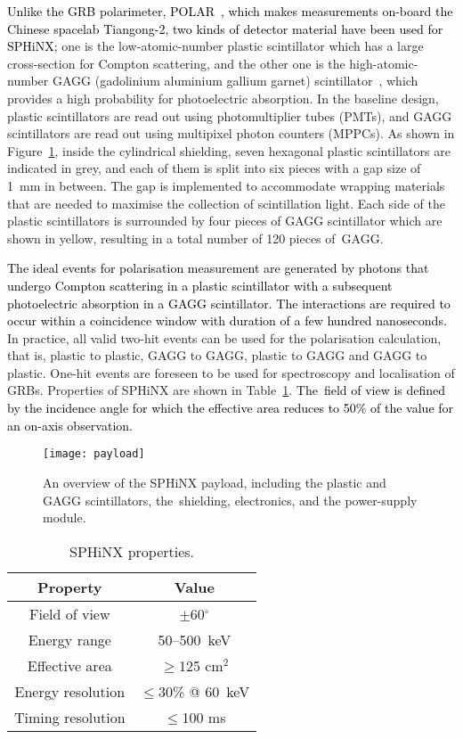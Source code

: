 \documentclass[galaxies,article,accept,moreauthors,pdftex,10pt,a4paper]{mdpi}
\begin{document}
\textcolor{black}{Unlike the GRB polarimeter, POLAR~\cite{ref:polar}, which makes measurements on-board the Chinese spacelab Tiangong-2, two kinds of detector material have been used for SPHiNX;} one is the low-atomic-number plastic scintillator which has a large cross-section for Compton scattering, and the other one is the high-atomic-number GAGG (gadolinium aluminium gallium garnet) scintillator\textcolor{black}{~\cite{ref:gagg}}, which provides a high probability for photoelectric absorption. In the baseline design, plastic scintillators are read out using photomultiplier tubes (PMTs), and GAGG scintillators are read out using multipixel photon counters (MPPCs).  As shown in Figure~\ref{fig:payload}, inside the cylindrical shielding, seven hexagonal plastic scintillators are indicated in grey, and each of them is split into six pieces with a gap size of 1~mm in between. The gap is implemented to accommodate wrapping materials that are needed to maximise the collection of scintillation light. Each side of the plastic scintillators is surrounded by four pieces of GAGG scintillator which are shown in yellow, resulting in a total number of 120 pieces of~GAGG.

\textcolor{black}{The ideal events for polarisation measurement are generated by photons that undergo Compton scattering in a plastic scintillator with a subsequent photoelectric absorption in a GAGG scintillator. The interactions are required to occur within a coincidence window with duration of a few hundred nanoseconds.} In practice, all valid two-hit events can be used for the polarisation calculation, that is, plastic to plastic, GAGG to GAGG, plastic to GAGG and GAGG to plastic.  One-hit events are foreseen to be used for spectroscopy and localisation of GRBs.
Properties of SPHiNX are shown in Table~\ref{table:property}. \textcolor{black}{The~field of view is defined by the incidence angle for which the effective area reduces to 50\% of the value for an on-axis observation.}

\begin{figure}[H]
\centering
\texttt{[image: payload]}
\caption{An overview of the SPHiNX payload, including the plastic and GAGG scintillators, the~shielding, electronics, and the power-supply module.} %
\label{fig:payload}
\end{figure}
\unskip
\begin{table}[H]
\caption{SPHiNX properties.}
\centering
\begin{tabular}{cc}
\toprule
\textbf{Property}	& \textbf{Value}\\
\midrule
Field of view		& 	$\pm$60$^{\circ}$		\\
Energy range		& 	50--500~keV			\\
Effective area		& 	$\geq$125 cm$^2$ 	\\
Energy resolution	& 	$\leq$30\% @ 60~keV	\\
Timing resolution	& 	$\leq$100 ms			\\
\bottomrule
\end{tabular}
\label{table:property}
\end{table}
\end{document}
